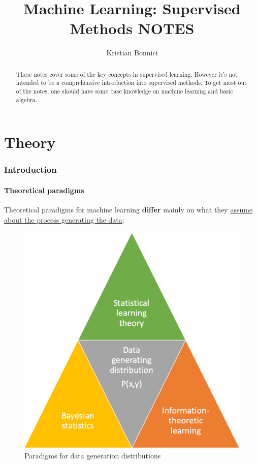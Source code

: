 \documentclass[12pt, a4paper]{article}
\title{Machine Learning: Supervised Methods NOTES}
\author{Kristian Bonnici}
\let\stdsection\section
\renewcommand\section{\newpage\stdsection} %
\begin{document}
\maketitle
\tableofcontents

\begin{abstract}
These notes cover some of the key concepts in supervised learning. However it's not intended to be a comprehensive introduction into supervised methods. To get most out of the notes, one should have some base knowledge on machine learning and basic algebra.
\end{abstract}

\printnomenclature





\newpage
\part{Theory}
\newpage

\section{Introduction}\label{introduction}

\subsection{Theoretical paradigms }\label{theoretical-paradigms}

Theoretical paradigms for machine learning \textbf{differ} mainly on
what they \uline{assume about the process generating the data}:

\begin{figure}[H]
  \centering  %
    \includegraphics[width=0.4\columnwidth]{images/theoretical-paradigms.png}
    \caption{Paradigms for data generation distributions}
    \label{fig:fig1}
\end{figure}
\end{document}
